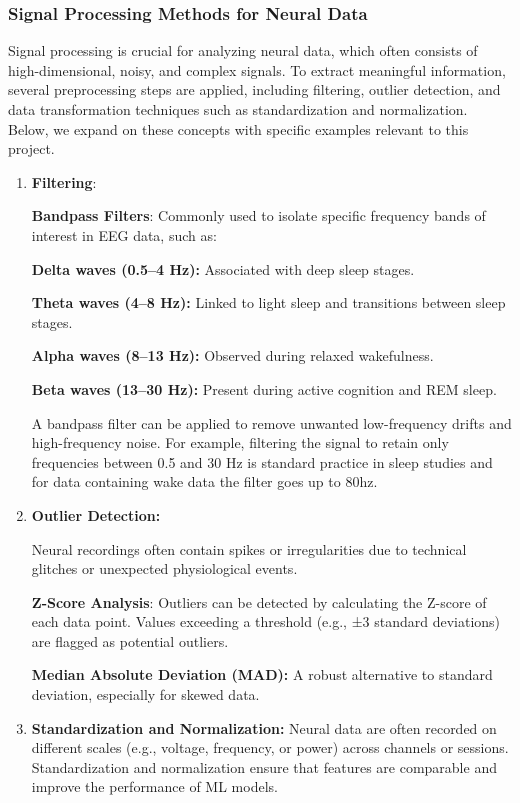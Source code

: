 \documentclass[a4paper,12pt,twoside]{article}
\begin{document}
\subsubsection{Signal Processing Methods for Neural Data}
Signal processing is crucial for analyzing neural data, which often consists of high-dimensional, noisy, and complex signals. To extract meaningful information, several preprocessing steps are applied, including filtering, outlier detection, and data transformation techniques such as standardization and normalization. Below, we expand on these concepts with specific examples relevant to this project.
\begin{enumerate}
    \item \textbf{Filtering}:
    
    \textbf{Bandpass Filters}: Commonly used to isolate specific frequency bands of interest in EEG data, such as:

    \textbf{Delta waves (0.5–4 Hz):} Associated with deep sleep stages.

    \textbf{Theta waves (4–8 Hz):} Linked to light sleep and transitions between sleep stages.

    \textbf{Alpha waves (8–13 Hz):} Observed during relaxed wakefulness.

    \textbf{Beta waves (13–30 Hz):} Present during active cognition and REM sleep.

A bandpass filter can be applied to remove unwanted low-frequency drifts and high-frequency noise. For example, filtering the signal to retain only frequencies between 0.5 and 30 Hz is standard practice in sleep studies and for data containing wake data the filter goes up to 80hz.

    

\item \textbf{Outlier Detection:}

    Neural recordings often contain spikes or irregularities due to technical glitches or unexpected physiological events.
    
    \textbf{Z-Score Analysis}: Outliers can be detected by calculating the Z-score of each data point. Values exceeding a threshold (e.g., ±3 standard deviations) are flagged as potential outliers.
    
    \textbf{Median Absolute Deviation (MAD):} A robust alternative to standard deviation, especially for skewed data.
    
\item \textbf{Standardization and Normalization:}
    Neural data are often recorded on different scales (e.g., voltage, frequency, or power) across channels or sessions. Standardization and normalization ensure that features are comparable and improve the performance of ML models.
        

\end{enumerate}
\end{document}
